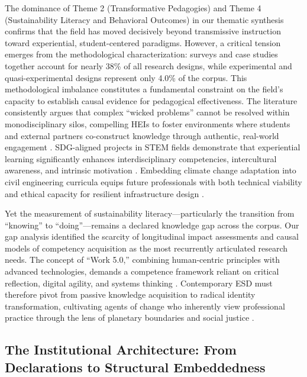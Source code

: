 \documentclass[pdflatex,sn-basic]{sn-jnl}%
\begin{document}
The dominance of Theme 2 (Transformative Pedagogies) and Theme 4 (Sustainability Literacy and Behavioral Outcomes) in our thematic synthesis confirms that the field has moved decisively beyond transmissive instruction toward experiential, student-centered paradigms. However, a critical tension emerges from the methodological characterization: surveys and case studies together account for nearly 38\% of all research designs, while experimental and quasi-experimental designs represent only 4.0\% of the corpus. This methodological imbalance constitutes a fundamental constraint on the field's capacity to establish causal evidence for pedagogical effectiveness. The literature consistently argues that complex ``wicked problems'' cannot be resolved within monodisciplinary silos, compelling HEIs to foster environments where students and external partners co-construct knowledge through authentic, real-world engagement \cite{kurris_facilitators_2026, leal_filho_promoting_2025}. SDG-aligned projects in STEM fields demonstrate that experiential learning significantly enhances interdisciplinary competencies, intercultural awareness, and intrinsic motivation \cite{poya_embedding_2026, roy_integrating_2025, johnson_comparisons_2026, hu_promoting_2026}. Embedding climate change adaptation into civil engineering curricula equips future professionals with both technical viability and ethical capacity for resilient infrastructure design \cite{dupuis_building_2025, kordi_teaching_2025, baah_building_2025}.

Yet the measurement of sustainability literacy---particularly the transition from ``knowing'' to ``doing''---remains a declared knowledge gap across the corpus. Our gap analysis identified the scarcity of longitudinal impact assessments and causal models of competency acquisition as the most recurrently articulated research needs. The concept of ``Work 5.0,'' combining human-centric principles with advanced technologies, demands a competence framework reliant on critical reflection, digital agility, and systems thinking \cite{zare_engineering_2026}. Contemporary ESD must therefore pivot from passive knowledge acquisition to radical identity transformation, cultivating agents of change who inherently view professional practice through the lens of planetary boundaries and social justice \cite{lopez_transformative_2025, ferreira_de_mello_classroom_2026}.

\subsection{The Institutional Architecture: From Declarations to Structural Embeddedness}
\end{document}
